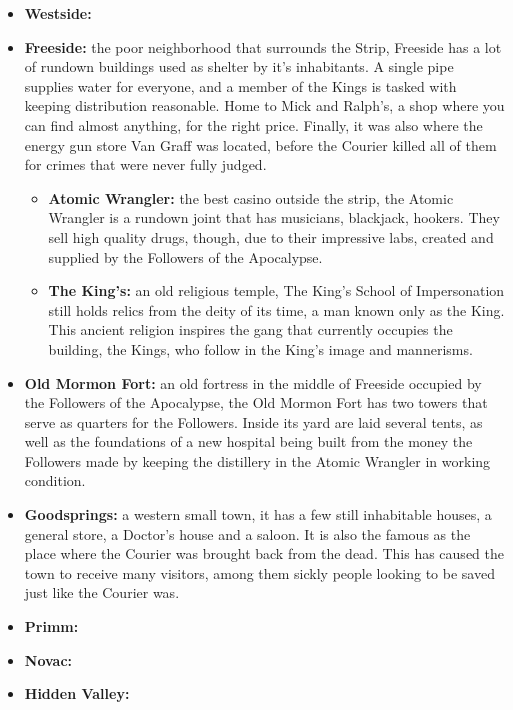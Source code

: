 \documentclass[11pt]{article} %
\begin{document}
\begin{itemize}
\item \textbf{Westside:}

\item \textbf{Freeside:} the poor neighborhood that surrounds the Strip, Freeside has a lot of rundown buildings used as shelter by it's inhabitants. A single pipe supplies water for everyone, and a member of the Kings is tasked with keeping distribution reasonable. Home to Mick and Ralph's, a shop where you can find almost anything, for the right price. Finally, it was also where the energy gun store Van Graff was located, before the Courier killed all of them for crimes that were never fully judged.
\begin{itemize}
\item \textbf{Atomic Wrangler:} the best casino outside the strip, the Atomic Wrangler is a rundown joint that has musicians, blackjack, hookers. They sell high quality drugs, though, due to their impressive labs, created and supplied by the Followers of the Apocalypse.
\item \textbf{The King's:} an old religious temple, The King's School of Impersonation still holds relics from the deity of its time, a man known only as the King. This ancient religion inspires the gang that currently occupies the building, the Kings, who follow in the King's image and mannerisms.
\end{itemize}

\item \textbf{Old Mormon Fort:} an old fortress in the middle of Freeside occupied by the Followers of the Apocalypse, the Old Mormon Fort has two towers that serve as quarters for the Followers. Inside its yard are laid several tents, as well as the foundations of a new hospital being built from the money the Followers made by keeping the distillery in the Atomic Wrangler in working condition.

\item \textbf{Goodsprings:} a western small town, it has a few still inhabitable houses, a general store, a Doctor's house and a saloon. It is also the famous as the place where the Courier was brought back from the dead. This has caused the town to receive many visitors, among them sickly people looking to be saved just like the Courier was.

\item \textbf{Primm:} 

\item \textbf{Novac:}

\item \textbf{Hidden Valley:}


\end{itemize}
\end{document}
